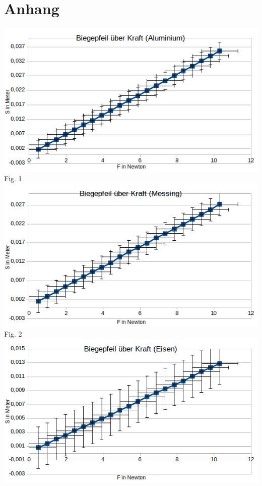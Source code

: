 \documentclass[11pt, a4paper]{article}
\begin{document}
\section{Anhang}

\includegraphics[scale=1]{bukA.png}\\
Fig. 1\\
\includegraphics[scale=1]{bukM.png}\\
Fig. 2\\
\includegraphics[scale=1]{bukE.png}\\
\end{document}
